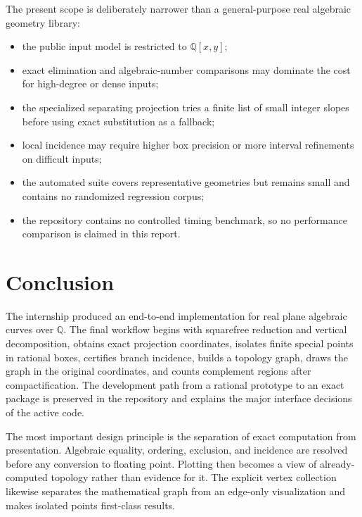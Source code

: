 \documentclass[11pt,a4paper]{article}
\newcommand{\QQ}{\mathbb{Q}}
\begin{document}
The present scope is deliberately narrower than a general-purpose real
algebraic geometry library:
\begin{itemize}
  \item the public input model is restricted to $\QQ[x,y]$;
  \item exact elimination and algebraic-number comparisons may dominate the
        cost for high-degree or dense inputs;
  \item the specialized separating projection tries a finite list of small
        integer slopes before using exact substitution as a fallback;
  \item local incidence may require higher box precision or more interval
        refinements on difficult inputs;
  \item the automated suite covers representative geometries but remains
        small and contains no randomized regression corpus;
  \item the repository contains no controlled timing benchmark, so no
        performance comparison is claimed in this report.
\end{itemize}


\clearpage
\section{Conclusion}

The internship produced an end-to-end implementation for real plane
algebraic curves over $\QQ$. The final workflow begins with squarefree
reduction and vertical decomposition, obtains exact projection coordinates,
isolates finite special points in rational boxes, certifies branch incidence,
builds a topology graph, draws the graph in the original coordinates, and
counts complement regions after compactification. The development path from a
rational prototype to an exact package is preserved in the repository and
explains the major interface decisions of the active code.

The most important design principle is the separation of exact computation
from presentation. Algebraic equality, ordering, exclusion, and incidence are
resolved before any conversion to floating point. Plotting then becomes a view
of already-computed topology rather than evidence for it. The explicit vertex
collection likewise separates the mathematical graph from an edge-only
visualization and makes isolated points first-class results.
\end{document}
